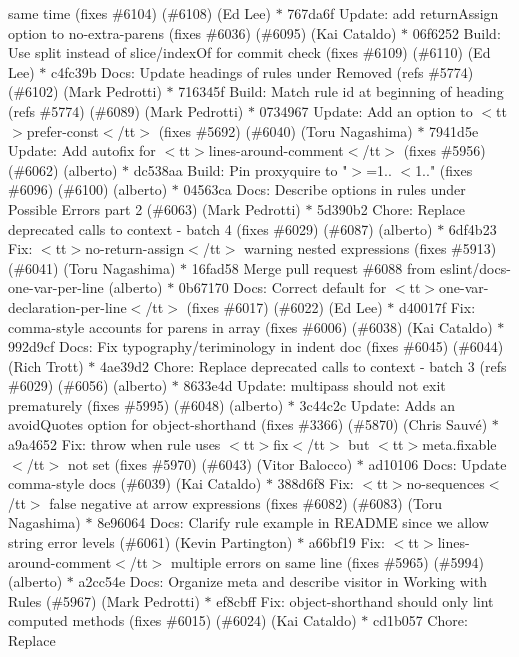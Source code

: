 \begin{DoxyItemize}
same time (fixes \#6104) (\#6108) (\+Ed Lee) \texorpdfstring{$\ast$}{*} 767da6f Update\+: add return\+Assign option to no-\/extra-\/parens (fixes \#6036) (\#6095) (\+Kai Cataldo) \texorpdfstring{$\ast$}{*} 06f6252 Build\+: Use split instead of slice/index\+Of for commit check (fixes \#6109) (\#6110) (\+Ed Lee) \texorpdfstring{$\ast$}{*} c4fc39b Docs\+: Update headings of rules under Removed (refs \#5774) (\#6102) (\+Mark Pedrotti) \texorpdfstring{$\ast$}{*} 716345f Build\+: Match rule id at beginning of heading (refs \#5774) (\#6089) (\+Mark Pedrotti) \texorpdfstring{$\ast$}{*} 0734967 Update\+: Add an option to $<$tt$>$prefer-\/const$<$/tt$>$ (fixes \#5692) (\#6040) (\+Toru Nagashima) \texorpdfstring{$\ast$}{*} 7941d5e Update\+: Add autofix for $<$tt$>$lines-\/around-\/comment$<$/tt$>$ (fixes \#5956) (\#6062) (alberto) \texorpdfstring{$\ast$}{*} dc538aa Build\+: Pin proxyquire to "{}\texorpdfstring{$>$}{>}=1.. \texorpdfstring{$<$}{<}1.."{} (fixes \#6096) (\#6100) (alberto) \texorpdfstring{$\ast$}{*} 04563ca Docs\+: Describe options in rules under Possible Errors part 2 (\#6063) (\+Mark Pedrotti) \texorpdfstring{$\ast$}{*} 5d390b2 Chore\+: Replace deprecated calls to context -\/ batch 4 (fixes \#6029) (\#6087) (alberto) \texorpdfstring{$\ast$}{*} 6df4b23 Fix\+: $<$tt$>$no-\/return-\/assign$<$/tt$>$ warning nested expressions (fixes \#5913) (\#6041) (\+Toru Nagashima) \texorpdfstring{$\ast$}{*} 16fad58 Merge pull request \#6088 from eslint/docs-\/one-\/var-\/per-\/line (alberto) \texorpdfstring{$\ast$}{*} 0b67170 Docs\+: Correct default for $<$tt$>$one-\/var-\/declaration-\/per-\/line$<$/tt$>$ (fixes \#6017) (\#6022) (\+Ed Lee) \texorpdfstring{$\ast$}{*} d40017f Fix\+: comma-\/style accounts for parens in array (fixes \#6006) (\#6038) (\+Kai Cataldo) \texorpdfstring{$\ast$}{*} 992d9cf Docs\+: Fix typography/teriminology in indent doc (fixes \#6045) (\#6044) (\+Rich Trott) \texorpdfstring{$\ast$}{*} 4ae39d2 Chore\+: Replace deprecated calls to context -\/ batch 3 (refs \#6029) (\#6056) (alberto) \texorpdfstring{$\ast$}{*} 8633e4d Update\+: multipass should not exit prematurely (fixes \#5995) (\#6048) (alberto) \texorpdfstring{$\ast$}{*} 3c44c2c Update\+: Adds an avoid\+Quotes option for object-\/shorthand (fixes \#3366) (\#5870) (\+Chris Sauvé) \texorpdfstring{$\ast$}{*} a9a4652 Fix\+: throw when rule uses $<$tt$>$fix$<$/tt$>$ but $<$tt$>$meta.\+fixable$<$/tt$>$ not set (fixes \#5970) (\#6043) (\+Vitor Balocco) \texorpdfstring{$\ast$}{*} ad10106 Docs\+: Update comma-\/style docs (\#6039) (\+Kai Cataldo) \texorpdfstring{$\ast$}{*} 388d6f8 Fix\+: $<$tt$>$no-\/sequences$<$/tt$>$ false negative at arrow expressions (fixes \#6082) (\#6083) (\+Toru Nagashima) \texorpdfstring{$\ast$}{*} 8e96064 Docs\+: Clarify rule example in README since we allow string error levels (\#6061) (\+Kevin Partington) \texorpdfstring{$\ast$}{*} a66bf19 Fix\+: $<$tt$>$lines-\/around-\/comment$<$/tt$>$ multiple errors on same line (fixes \#5965) (\#5994) (alberto) \texorpdfstring{$\ast$}{*} a2cc54e Docs\+: Organize meta and describe visitor in Working with Rules (\#5967) (\+Mark Pedrotti) \texorpdfstring{$\ast$}{*} ef8cbff Fix\+: object-\/shorthand should only lint computed methods (fixes \#6015) (\#6024) (\+Kai Cataldo) \texorpdfstring{$\ast$}{*} cd1b057 Chore\+: Replace 
\end{DoxyItemize}
